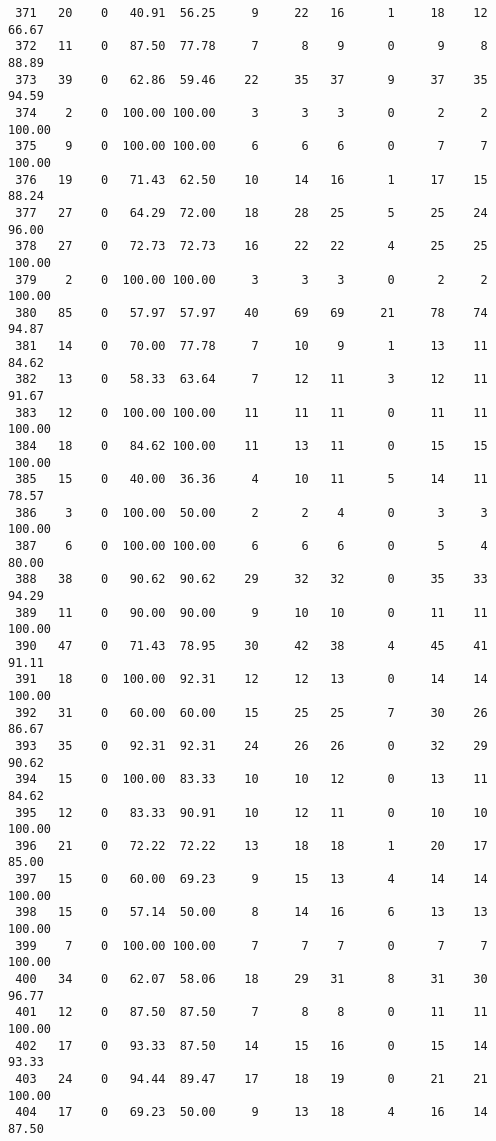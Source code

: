 \begin{verbatim}
 371   20    0   40.91  56.25     9     22   16      1     18    12    66.67
 372   11    0   87.50  77.78     7      8    9      0      9     8    88.89
 373   39    0   62.86  59.46    22     35   37      9     37    35    94.59
 374    2    0  100.00 100.00     3      3    3      0      2     2   100.00
 375    9    0  100.00 100.00     6      6    6      0      7     7   100.00
 376   19    0   71.43  62.50    10     14   16      1     17    15    88.24
 377   27    0   64.29  72.00    18     28   25      5     25    24    96.00
 378   27    0   72.73  72.73    16     22   22      4     25    25   100.00
 379    2    0  100.00 100.00     3      3    3      0      2     2   100.00
 380   85    0   57.97  57.97    40     69   69     21     78    74    94.87
 381   14    0   70.00  77.78     7     10    9      1     13    11    84.62
 382   13    0   58.33  63.64     7     12   11      3     12    11    91.67
 383   12    0  100.00 100.00    11     11   11      0     11    11   100.00
 384   18    0   84.62 100.00    11     13   11      0     15    15   100.00
 385   15    0   40.00  36.36     4     10   11      5     14    11    78.57
 386    3    0  100.00  50.00     2      2    4      0      3     3   100.00
 387    6    0  100.00 100.00     6      6    6      0      5     4    80.00
 388   38    0   90.62  90.62    29     32   32      0     35    33    94.29
 389   11    0   90.00  90.00     9     10   10      0     11    11   100.00
 390   47    0   71.43  78.95    30     42   38      4     45    41    91.11
 391   18    0  100.00  92.31    12     12   13      0     14    14   100.00
 392   31    0   60.00  60.00    15     25   25      7     30    26    86.67
 393   35    0   92.31  92.31    24     26   26      0     32    29    90.62
 394   15    0  100.00  83.33    10     10   12      0     13    11    84.62
 395   12    0   83.33  90.91    10     12   11      0     10    10   100.00
 396   21    0   72.22  72.22    13     18   18      1     20    17    85.00
 397   15    0   60.00  69.23     9     15   13      4     14    14   100.00
 398   15    0   57.14  50.00     8     14   16      6     13    13   100.00
 399    7    0  100.00 100.00     7      7    7      0      7     7   100.00
 400   34    0   62.07  58.06    18     29   31      8     31    30    96.77
 401   12    0   87.50  87.50     7      8    8      0     11    11   100.00
 402   17    0   93.33  87.50    14     15   16      0     15    14    93.33
 403   24    0   94.44  89.47    17     18   19      0     21    21   100.00
 404   17    0   69.23  50.00     9     13   18      4     16    14    87.50

\end{verbatim}
